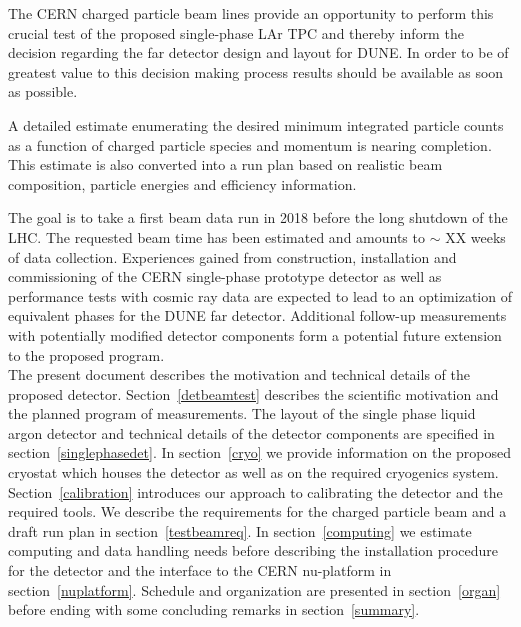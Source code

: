 The CERN charged particle beam lines provide an opportunity to perform this crucial test of the 
proposed single-phase LAr TPC and thereby inform the decision regarding the far detector design and layout for DUNE.
In order to be of greatest value to this decision making process results should be available as soon as possible.


A detailed estimate enumerating the desired minimum integrated particle counts as a function
of charged particle species and momentum is nearing completion. This estimate is also converted 
into a run plan based on realistic beam composition, particle energies and efficiency information. 

The goal is to take a first beam data run in 2018 before the long shutdown of the LHC. 
The requested beam time has been estimated and amounts to {\color{red} $\sim$ XX weeks} of data collection. 
Experiences gained from construction, installation and commissioning of the CERN single-phase prototype detector 
as well as performance tests with cosmic ray data are expected to lead to an optimization of equivalent phases 
for the DUNE far detector. 
Additional follow-up measurements with potentially modified detector components form a potential future extension 
to the proposed program.\\

The present document describes the motivation and technical details of the proposed detector. Section~\ref{detbeamtest} describes the scientific motivation and the planned program of measurements. The layout of the single phase liquid argon detector and technical details of the detector components are specified in section~\ref{singlephasedet}. In section~\ref{cryo} we provide information on the proposed cryostat which houses the detector as well as on the required cryogenics system. Section~\ref{calibration} introduces our approach to calibrating the detector and the 
required tools. We describe the requirements for the charged particle beam and a draft run plan in section~\ref{testbeamreq}.
In section~\ref{computing} we estimate computing and data handling needs before describing the installation procedure for the detector
and the interface to the CERN nu-platform in section~\ref{nuplatform}. Schedule and organization are presented in section~\ref{organ} before
ending with some concluding remarks in section~\ref{summary}.







%






